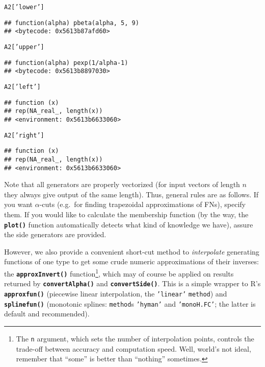 \documentclass[11pt]{article}\usepackage[]{graphicx}\usepackage[]{color}
\makeatletter
\newcommand{\hlstr}[1]{\textcolor[rgb]{0.192,0.494,0.8}{#1}}%
\newcommand{\hlstd}[1]{\textcolor[rgb]{0.345,0.345,0.345}{#1}}%
\newcommand{\hlkwc}[1]{\textcolor[rgb]{0.333,0.667,0.333}{#1}}%
\newcommand{\hlkwd}[1]{\textcolor[rgb]{0.737,0.353,0.396}{\textbf{#1}}}%
\newenvironment{kframe}{%
 \def\at@end@of@kframe{}%
 \ifinner\ifhmode%
  \def\at@end@of@kframe{\end{minipage}}%
  \begin{minipage}{\columnwidth}%
 \fi\fi%
 \def\FrameCommand##1{\hskip\@totalleftmargin \hskip-\fboxsep
 \colorbox{shadecolor}{##1}\hskip-\fboxsep
     \hskip-\linewidth \hskip-\@totalleftmargin \hskip\columnwidth}%
 \MakeFramed {\advance\hsize-\width
   \@totalleftmargin\z@ \linewidth\hsize
   \@setminipage}}%
 {\par\unskip\endMakeFramed%
 \at@end@of@kframe}
\newenvironment{knitrout}{}{} %
\newcommand{\lang}[1]{\textsf{#1}\xspace}
\newcommand{\R}{\lang{R}}
\newcommand{\func}[1]{\texttt{\hlkwd{#1}}}
\newcommand{\argument}[1]{\texttt{\hlkwc{#1}}}
\newcommand{\str}[1]{\texttt{\hlstr{#1}}}
\makeatother
\begin{document}
\begin{knitrout}\small
{}\color{fgcolor}\begin{kframe}
\begin{alltt}
\hlstd{A2[}\hlstr{'lower'}\hlstd{]}
\end{alltt}
\begin{verbatim}
## function(alpha) pbeta(alpha, 5, 9)
## <bytecode: 0x5613b87afd60>
\end{verbatim}
\begin{alltt}
\hlstd{A2[}\hlstr{'upper'}\hlstd{]}
\end{alltt}
\begin{verbatim}
## function(alpha) pexp(1/alpha-1)
## <bytecode: 0x5613b8897030>
\end{verbatim}
\begin{alltt}
\hlstd{A2[}\hlstr{'left'}\hlstd{]}
\end{alltt}
\begin{verbatim}
## function (x) 
## rep(NA_real_, length(x))
## <environment: 0x5613b6633060>
\end{verbatim}
\begin{alltt}
\hlstd{A2[}\hlstr{'right'}\hlstd{]}
\end{alltt}
\begin{verbatim}
## function (x) 
## rep(NA_real_, length(x))
## <environment: 0x5613b6633060>
\end{verbatim}
\end{kframe}
\end{knitrout}

\noindent
Note that all generators are properly vectorized (for
input vectors of length $n$ they always give output of the
same length).
Thus, general rules are as follows.
If you want $\alpha$-cuts (e.g.~for finding
trapezoidal approximations of FNs), specify them.
If you would like to calculate the membership function (by the way,
the \func{plot()} function
automatically detects what kind of knowledge we have),
assure the side generators are provided.


However, we also provide a convenient short-cut method
to \textit{interpolate} generating functions of one type
to get some crude numeric approximations of their inverses:
the \func{approxInvert()}
function\footnote{The
\argument{n} argument, which sets the number of interpolation points,
controls the trade-off between accuracy and computation speed.
Well, world's not ideal, remember that ``some'' is better than ``nothing''
sometimes.}, which may
of course be applied on results returned by
\func{convertAlpha()}
and \func{convertSide()}.
This is a simple wrapper to \R's \func{approxfun()}
(piecewise linear interpolation,
the \str{'{}linear'{}} \argument{method})
and \func{splinefun()} (monotonic
splines: \argument{method}s \str{'{}hyman{}'}
and \str{'{}monoH.FC'{}}; the latter is
default and recommended).
\end{document}
